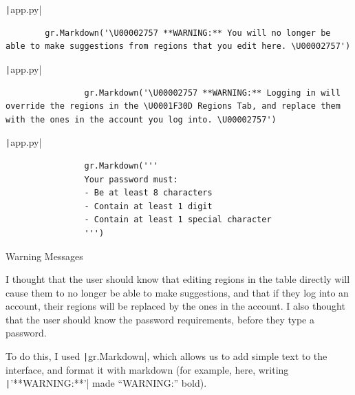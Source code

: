 \documentclass[12pt]{report}
\newcommand{\pil}[1]{\protect\texttt|#1|}
\begin{document}
\begin{listing}[H]
\pil{app.py}
\begin{verbatim}
        gr.Markdown('\U00002757 **WARNING:** You will no longer be able to make suggestions from regions that you edit here. \U00002757')
\end{verbatim}
\pil{app.py}
\begin{verbatim}
                gr.Markdown('\U00002757 **WARNING:** Logging in will override the regions in the \U0001F30D Regions Tab, and replace them with the ones in the account you log into. \U00002757')
\end{verbatim}
\pil{app.py}
\begin{verbatim}
                gr.Markdown('''
                Your password must:
                - Be at least 8 characters
                - Contain at least 1 digit
                - Contain at least 1 special character
                ''')
\end{verbatim}
\caption{Warning Messages}\label{cs:warningMarkdown}
\end{listing}

I thought that the user should know that editing regions in the table directly will cause them to no longer be able to make suggestions, and that if they log into an account, their regions will be replaced by the ones in the account. I also thought that the user should know the password requirements, before they type a password.

To do this, I used \pil{gr.Markdown}, which allows us to add simple text to the interface, and format it with markdown (for example, here, writing \pil{'**WARNING:**'} made ``WARNING:'' bold).
\end{document}
